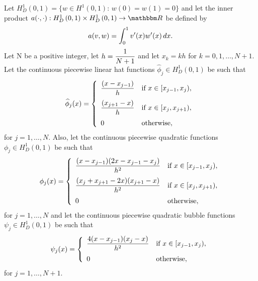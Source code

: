 Let $H^1_D\left(0,1\right)=\{w\in H^1(0,1):\,w(0)=w(1)=0\}$ and let the inner product $a\ip{\cdot,\cdot}:H^1_D\left(0,1\right)\times H^1_D\left(0,1\right)\to\R$ be defined by
\[
a(v,w)=\int_0^1v'(x)w'(x)\,dx.
\]
Let N be a positive integer, let $\displaystyle{h={1 \over N+1}}$ and let $x_k=kh$ for $k=0,1,\ldots,N+1$. Let the continuous piecewise linear hat functions $\widehat{\phi}_j\in H^1_D\left(0,1\right)$ be such that
\[
\widehat{\phi}_j(x) = \left\{\begin{array}{ll}
\displaystyle{{(x-x_{j-1}) \over h}} & \displaystyle{\mbox{if }x\in[x_{j-1},x_j)},
\\[10pt]
\displaystyle{{(x_{j+1}-x) \over h}} & \displaystyle{\mbox{if }x\in[x_j,x_{j+1})},
\\[10pt]
0 & \mbox{otherwise},
\end{array}\right.
\]
for $j=1,\ldots,N$. Also, let the continuous piecewise quadratic functions $\phi_j\in H^1_D\left(0,1\right)$ be such that
\[
\phi_j(x)=\left\{\begin{array}{ll}
\displaystyle{{(x-x_{j-1})(2x-x_{j-1}-x_j) \over h^2}} & \displaystyle{\mbox{if }x\in[x_{j-1},x_j)},
\\[10pt]
\displaystyle{{(x_j+x_{j+1}-2x)(x_{j+1}-x) \over h^2}} & \displaystyle{\mbox{if }x\in[x_j,x_{j+1})},
\\[10pt]
0 & \mbox{otherwise},
\end{array}\right.
\]
for $j=1,\ldots,N$ and let the continuous piecewise quadratic bubble functions $\psi_j\in H^1_D\left(0,1\right)$ be such that
\[
\psi_j(x)=\left\{\begin{array}{ll}
\displaystyle{{4(x-x_{j-1})(x_j-x) \over h^2}} & \displaystyle{\mbox{if }x\in[x_{j-1},x_j)},
\\[10pt]
0 & \mbox{otherwise},
\end{array}\right.
\]
for $j=1,\ldots,N+1$.

